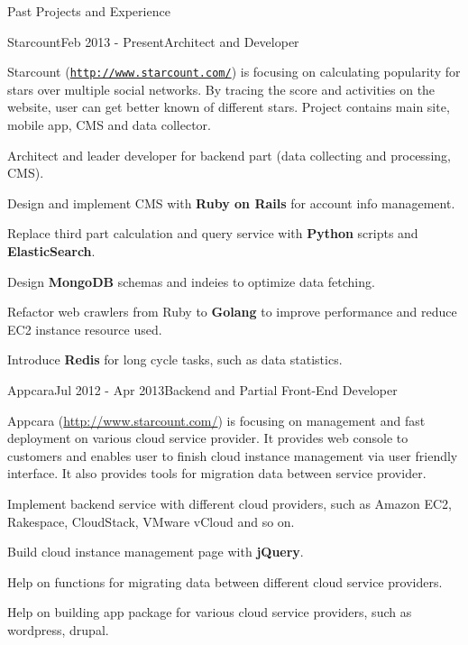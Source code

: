 \documentclass{resume} %
\newcommand{\http}{http:/\hspace{-0.3ex}/}
\begin{document}
\begin{rSection}{Past Projects and Experience}



\begin{rSubsection}{Starcount}{Feb 2013 - Present}{Architect and Developer}{}

Starcount (\href{http://www.starcount.com/}{\tt \http{}www.starcount.com/}) is focusing on calculating popularity for stars over multiple social networks. By tracing the score and activities on the website, user can get better known of different stars. Project contains main site, mobile app, CMS and data collector.

\begin{rSubsectionList}
\item Architect and leader developer for backend part (data collecting and processing, CMS).
\item Design and implement CMS with \textbf{Ruby on Rails} for account info management.
\item Replace third part calculation and query service with \textbf{Python} scripts and \textbf{ElasticSearch}.
\item Design \textbf{MongoDB} schemas and indeies to optimize data fetching.
\item Refactor web crawlers from Ruby to \textbf{Golang} to improve performance and reduce EC2 instance resource used.
\item Introduce \textbf{Redis} for long cycle tasks, such as data statistics.
\end{rSubsectionList}
\end{rSubsection}



\begin{rSubsection}{Appcara}{Jul 2012 - Apr 2013}{Backend and Partial Front-End Developer}{}

Appcara (\href{http://www.starcount.com/}{\http{}www.starcount.com/}) is focusing on management and fast deployment on various cloud service provider. It provides web console to customers and enables user to finish cloud instance management via user friendly interface. It also provides tools for migration data between service provider. 

\begin{rSubsectionList}
\item Implement backend service with different cloud providers, such as Amazon EC2, Rakespace, CloudStack, VMware vCloud and so on.
\item Build cloud instance management page with \textbf{jQuery}.
\item Help on functions for migrating data between different cloud service providers.
\item Help on building app package for various cloud service providers, such as wordpress, drupal.
\end{rSubsectionList}
\end{rSubsection}




\end{rSection}
\end{document}

